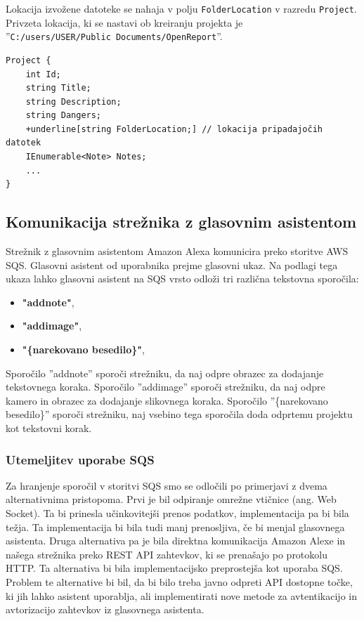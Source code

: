 \documentclass[a4paper, 12pt]{book}
\begin{document}
Lokacija izvožene datoteke se nahaja v polju \texttt{FolderLocation} v razredu \texttt{Project}.
Privzeta lokacija, ki se nastavi ob kreiranju projekta je 
\\''\texttt{C:/users/USER/Public Documents/OpenReport}''.

\begin{Verbatim}[commandchars=+\[\]]
Project {
    int Id; 
    string Title; 
    string Description; 
    string Dangers; 
    +underline[string FolderLocation;] // lokacija pripadajočih datotek 
    IEnumerable<Note> Notes; 
    ... 
}
\end{Verbatim}

\subsection{Komunikacija strežnika z glasovnim asistentom}

Strežnik z glasovnim asistentom Amazon Alexa komunicira preko storitve AWS SQS.
Glasovni asistent od uporabnika prejme glasovni ukaz.
Na podlagi tega ukaza lahko glasovni asistent na SQS vrsto odloži tri različna tekstovna sporočila:
\begin{itemize}
	\item \textbf{"addnote"},
	\item \textbf{"addimage"},
	\item \textbf{"\{narekovano besedilo\}"},
\end{itemize}

Sporočilo ''addnote'' sporoči strežniku, da naj odpre obrazec za dodajanje tekstovnega koraka.
Sporočilo ''addimage'' sporoči strežniku, da naj odpre kamero in obrazec za dodajanje slikovnega koraka.
Sporočilo ''\{narekovano besedilo\}'' sporoči strežniku, naj vsebino tega sporočila doda odprtemu projektu kot tekstovni korak.

\subsubsection{Utemeljitev uporabe SQS}
Za hranjenje sporočil v storitvi SQS smo se odločili po primerjavi z dvema alternativnima pristopoma.
Prvi je bil odpiranje omrežne vtičnice (ang. Web Socket).
Ta bi prinesla učinkovitejši prenos podatkov, implementacija pa bi bila težja.
Ta implementacija bi bila tudi manj prenosljiva, če bi menjal glasovnega asistenta.
Druga alternativa pa je bila direktna komunikacija Amazon Alexe in našega strežnika preko REST API zahtevkov, ki se prenašajo po protokolu HTTP.
Ta alternativa bi bila implementacijsko preprostejša kot uporaba SQS.
Problem te alternative bi bil, da bi bilo treba javno odpreti API dostopne točke, ki jih lahko asistent uporablja, ali implementirati nove metode za avtentikacijo in avtorizacijo zahtevkov iz glasovnega asistenta.
\end{document}
